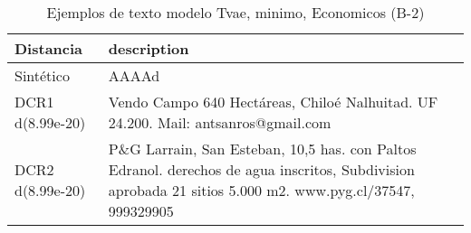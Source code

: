 \begin{table}[H]
\centering
\fontsize{10}{14}\selectfont
\caption{Ejemplos de texto modelo Tvae, minimo, Economicos (B-2)}
\label{table-example-economicos-b-2-tvae-min-text}
\begin{tabular}{|l|m{35em}|}
\hline
\rowcolor[gray]{0.8}
Distancia & description \\
\hline Sintético & AAAAd \\
\hline DCR1 d(8.99e-20) & Vendo Campo 640 Hect\'areas, Chilo\'e Nalhuitad. UF 24.200. Mail: antsanros@gmail.com \\
\hline DCR2 d(8.99e-20) & P\&G Larrain, San Esteban, 10,5 has. con Paltos Edranol. derechos de agua inscritos, Subdivision aprobada 21 sitios 5.000 m2. www.pyg.cl/37547, 999329905 \\
\hline
\end{tabular}
\end{table}
